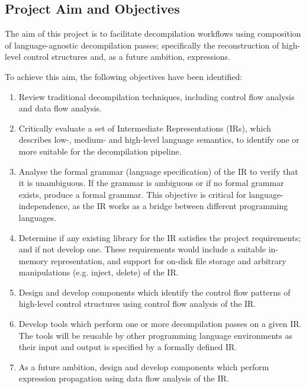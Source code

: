 
\subsection{Project Aim and Objectives}
\label{sec:intro_project_aim_and_objectives}

The aim of this project is to facilitate decompilation workflows using composition of language-agnostic decompilation passes; specifically the reconstruction of high-level control structures and, as a future ambition, expressions.

To achieve this aim, the following objectives have been identified:

\begin{enumerate}
	\item Review traditional decompilation techniques, including control flow analysis and data flow analysis.
	\label{itm:obj_review_decomp_techniques}
	\item Critically evaluate a set of Intermediate Representations (IRs), which describes low-, medium- and high-level language semantics, to identify one or more suitable for the decompilation pipeline.
	\label{itm:obj_review_suitable_ir}
	\item Analyse the formal grammar (language specification) of the IR to verify that it is unambiguous. If the grammar is ambiguous or if no formal grammar exists, produce a formal grammar. This objective is critical for language-independence, as the IR works as a bridge between different programming languages.
	\label{itm:obj_formal_ir}
	\item Determine if any existing library for the IR satisfies the project requirements; and if not develop one. These requirements would include a suitable in-memory representation, and support for on-disk file storage and arbitrary manipulations (e.g. inject, delete) of the IR.
	\label{itm:obj_ir_library}
	\item Design and develop components which identify the control flow patterns of high-level control structures using control flow analysis of the IR.
	\label{itm:obj_control_flow_analysis_component}
	\item Develop tools which perform one or more decompilation passes on a given IR. The tools will be reusable by other programming language environments as their input and output is specified by a formally defined IR.
	\label{itm:obj_decomp_pass_tool}
	\item As a future ambition, design and develop components which perform expression propagation using data flow analysis of the IR.
	\label{itm:obj_data_analysis_library}
\end{enumerate}
